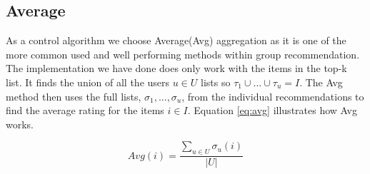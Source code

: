 \subsection{Average}\label{sec:average}
As a control algorithm we choose Average(Avg) aggregation as it is one of the more common used and well performing methods within group recommendation. The implementation we have done does only work with the items in the top-k list. It finds the union of all the users $u\in U$ lists so $\tau_1 \cup ... \cup \tau_u = I$. The Avg method then uses the full lists, $\sigma_1, ..., \sigma_u$, from the individual recommendations to find the average rating for the items $i \in I$. Equation \ref{eq:avg} illustrates how Avg works.

\begin{equation}\label{eq:avg}
Avg(i) = \frac{\sum_{u \in U} \sigma_u(i)}{|U|} 
\end{equation}